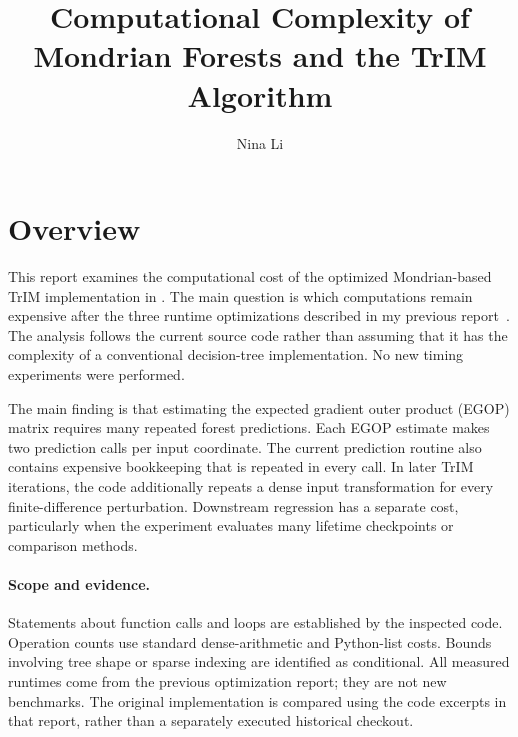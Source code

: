 \documentclass[11pt]{article}
\title{Computational Complexity of Mondrian Forests and the TrIM Algorithm}
\author{Nina Li}
\date{}
\newcommand{\code}[1]{\texttt{\detokenize{#1}}}
\begin{document}
\maketitle

\section{Overview}

This report examines the computational cost of the optimized Mondrian-based TrIM implementation in \code{TrIM_project/estimatedH_CSS/src/}. The main question is which computations remain expensive after the three runtime optimizations described in my previous report~\cite{optimization}. The analysis follows the current source code rather than assuming that it has the complexity of a conventional decision-tree implementation. No new timing experiments were performed.

The main finding is that estimating the expected gradient outer product (EGOP) matrix requires many repeated forest predictions. Each EGOP estimate makes two prediction calls per input coordinate. The current prediction routine also contains expensive bookkeeping that is repeated in every call. In later TrIM iterations, the code additionally repeats a dense input transformation for every finite-difference perturbation. Downstream regression has a separate cost, particularly when the experiment evaluates many lifetime checkpoints or comparison methods.

\paragraph{Scope and evidence.}
Statements about function calls and loops are established by the inspected code. Operation counts use standard dense-arithmetic and Python-list costs. Bounds involving tree shape or sparse indexing are identified as conditional. All measured runtimes come from the previous optimization report; they are not new benchmarks. The original implementation is compared using the code excerpts in that report, rather than a separately executed historical checkout.
\end{document}
